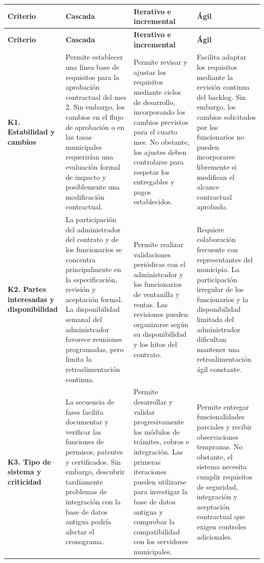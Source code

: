 \documentclass[12pt,a4paper]{article}
\begin{document}
\begin{longtable}{|>{\raggedright\arraybackslash}p{}|>{\raggedright\arraybackslash}p{}|>{\raggedright\arraybackslash}p{}|>{\raggedright\arraybackslash}p{}|}
\hline
\textbf{Criterio} &
\textbf{Cascada} &
\textbf{Iterativo e incremental} &
\textbf{Ágil} \\
\hline
\endfirsthead

\hline
\textbf{Criterio} &
\textbf{Cascada} &
\textbf{Iterativo e incremental} &
\textbf{Ágil} \\
\hline
\endhead

\textbf{K1. Estabilidad y cambios} &
Permite establecer una línea base de requisitos para la aprobación contractual del mes 2. Sin embargo, los cambios en el flujo de aprobación o en las tasas municipales requerirían una evaluación formal de impacto y posiblemente una modificación contractual. &
Permite revisar y ajustar los requisitos mediante ciclos de desarrollo, incorporando los cambios previstos para el cuarto mes. No obstante, los ajustes deben controlarse para respetar los entregables y pagos establecidos. &
Facilita adaptar los requisitos mediante la revisión continua del backlog. Sin embargo, los cambios solicitados por los funcionarios no pueden incorporarse libremente si modifican el alcance contractual aprobado. \\
\hline

\textbf{K2. Partes interesadas y disponibilidad} &
La participación del administrador del contrato y de los funcionarios se concentra principalmente en la especificación, revisión y aceptación formal. La disponibilidad semanal del administrador favorece reuniones programadas, pero limita la retroalimentación continua. &
Permite realizar validaciones periódicas con el administrador y los funcionarios de ventanilla y rentas. Las revisiones pueden organizarse según su disponibilidad y los hitos del contrato. &
Requiere colaboración frecuente con representantes del municipio. La participación irregular de los funcionarios y la disponibilidad limitada del administrador dificultan mantener una retroalimentación ágil constante. \\
\hline

\textbf{K3. Tipo de sistema y criticidad} &
La secuencia de fases facilita documentar y verificar las funciones de permisos, patentes y certificados. Sin embargo, descubrir tardíamente problemas de integración con la base de datos antigua podría afectar el cronograma. &
Permite desarrollar y validar progresivamente los módulos de trámites, cobros e integración. Las primeras iteraciones pueden utilizarse para investigar la base de datos antigua y comprobar la compatibilidad con los servidores municipales. &
Permite entregar funcionalidades parciales y recibir observaciones tempranas. No obstante, el sistema necesita cumplir requisitos de seguridad, integración y aceptación contractual que exigen controles adicionales. \\
\hline


\end{longtable}
\end{document}
